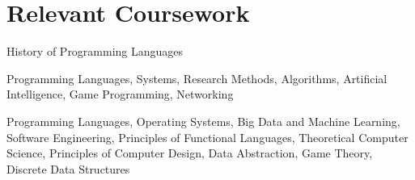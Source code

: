 \section{Relevant Coursework}

%
{}%
{}%
{}%
{History of Programming Languages%
\newline{}
}

%
{}%
{}%
{}%
{Programming Languages, Systems, Research Methods, Algorithms, Artificial
Intelligence, Game Programming, Networking%
\newline{}
}

%
{}%
{}%
{}%
{Programming Languages, Operating Systems, Big Data and Machine Learning,
Software Engineering, Principles of Functional Languages, Theoretical Computer
Science, Principles of Computer Design, Data Abstraction, Game Theory, Discrete
Data Structures
\newline{}
}
